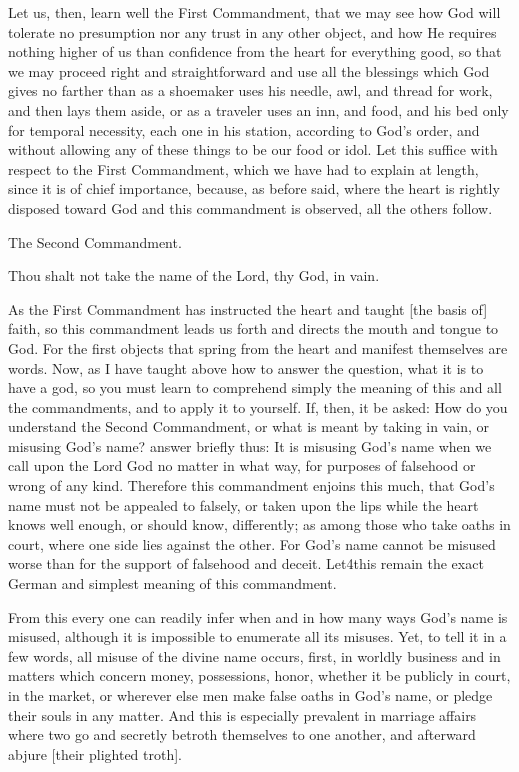 Let us, then, learn well the First Commandment, that we may see how God
will tolerate no presumption nor any trust in any other object, and how
He requires nothing higher of us than confidence from the heart for
everything good, so that we may proceed right and straightforward and
use all the blessings which God gives no farther than as a shoemaker
uses his needle, awl, and thread for work, and then lays them aside, or
as a traveler uses an inn, and food, and his bed only for temporal
necessity, each one in his station, according to God's order, and
without allowing any of these things to be our food or idol. Let this
suffice with respect to the First Commandment, which we have had to
explain at length, since it is of chief importance, because, as before
said, where the heart is rightly disposed toward God and this
commandment is observed, all the others follow.



The Second Commandment.

Thou shalt not take the name of the Lord, thy God, in vain.


As the First Commandment has instructed the heart and taught [the
basis of] faith, so this commandment leads us forth and directs the
mouth and tongue to God. For the first objects that spring from the
heart and manifest themselves are words. Now, as I have taught above
how to answer the question, what it is to have a god, so you must learn
to comprehend simply the meaning of this and all the commandments, and
to apply it to yourself. If, then, it be asked: How do you understand
the Second Commandment, or what is meant by taking in vain, or misusing
God's name? answer briefly thus: It is misusing God's name when we call
upon the Lord God no matter in what way, for purposes of falsehood or
wrong of any kind. Therefore this commandment enjoins this much, that
God's name must not be appealed to falsely, or taken upon the lips
while the heart knows well enough, or should know, differently; as
among those who take oaths in court, where one side lies against the
other. For God's name cannot be misused worse than for the support of
falsehood and deceit. Let4this remain the exact German and simplest
meaning of this commandment.

From this every one can readily infer when and in how many ways God's
name is misused, although it is impossible to enumerate all its
misuses. Yet, to tell it in a few words, all misuse of the divine name
occurs, first, in worldly business and in matters which concern money,
possessions, honor, whether it be publicly in court, in the market, or
wherever else men make false oaths in God's name, or pledge their souls
in any matter. And this is especially prevalent in marriage affairs
where two go and secretly betroth themselves to one another, and
afterward abjure [their plighted troth].

